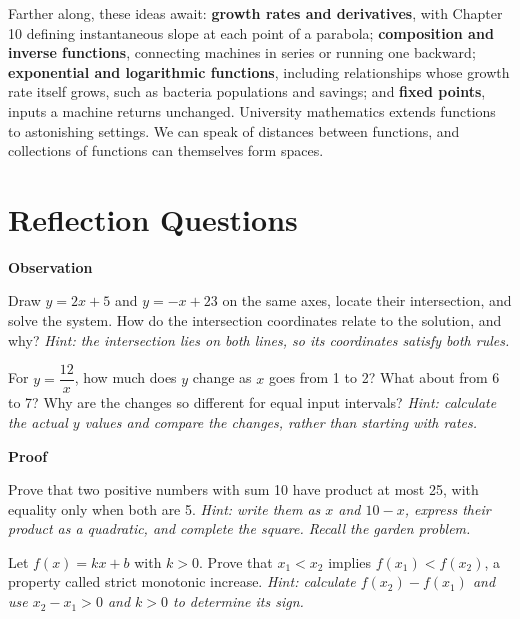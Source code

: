 \begin{pandeng}
Farther along, these ideas await: \textbf{growth rates and derivatives}, with Chapter 10 defining instantaneous slope at each point of a parabola; \textbf{composition and inverse functions}, connecting machines in series or running one backward; \textbf{exponential and logarithmic functions}, including relationships whose growth rate itself grows, such as bacteria populations and savings; and \textbf{fixed points}, inputs a machine returns unchanged. University mathematics extends functions to astonishing settings. We can speak of distances between functions, and collections of functions can themselves form spaces.
\end{pandeng}

\section*{Reflection Questions}

\textbf{Observation}
\begin{sikao}
\item Draw $y = 2x + 5$ and $y = -x + 23$ on the same axes, locate their intersection, and solve the system. How do the intersection coordinates relate to the solution, and why? \emph{Hint: the intersection lies on both lines, so its coordinates satisfy both rules.}
\item For $y = \dfrac{12}{x}$, how much does $y$ change as $x$ goes from 1 to 2? What about from 6 to 7? Why are the changes so different for equal input intervals? \emph{Hint: calculate the actual $y$ values and compare the changes, rather than starting with rates.}
\end{sikao}

\textbf{Proof}
\begin{sikao}
\item Prove that two positive numbers with sum 10 have product at most 25, with equality only when both are 5. \emph{Hint: write them as $x$ and $10 - x$, express their product as a quadratic, and complete the square. Recall the garden problem.}
\item Let $f(x) = kx + b$ with $k > 0$. Prove that $x_1 < x_2$ implies $f(x_1) < f(x_2)$, a property called strict monotonic increase. \emph{Hint: calculate $f(x_2) - f(x_1)$ and use $x_2 - x_1 > 0$ and $k > 0$ to determine its sign.}
\end{sikao}

